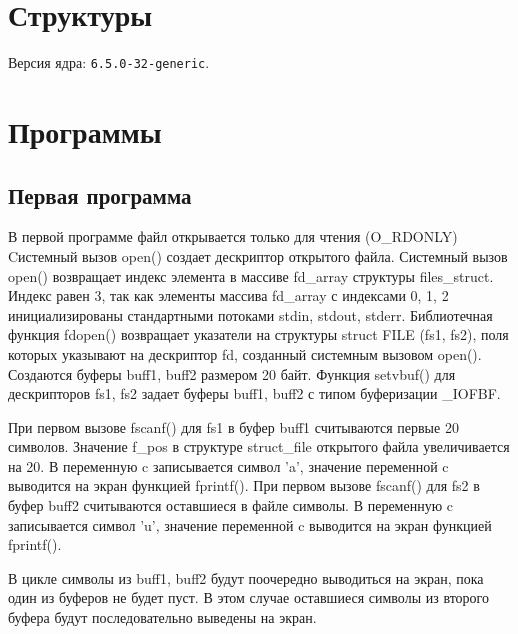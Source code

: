 \chapter{Структуры}

Версия ядра: \texttt{6.5.0-32-generic}.



\chapter{Программы}

\section{Первая программа}



В первой программе файл открывается только для чтения (O\_RDONLY)
Cистемный вызов open() создает дескриптор открытого файла.
Системный вызов open() возвращает индекс элемента в массиве fd\_array структуры files\_struct.
Индекс равен 3, так как элементы массива fd\_array с индексами 0, 1, 2 инициализированы стандартными потоками stdin, stdout, stderr.
Библиотечная функция fdopen() возвращает указатели на структуры struct FILE (fs1, fs2), поля которых указывают на дескриптор fd, созданный системным вызовом open().
Создаются буферы buff1, buff2 размером 20 байт.
Функция setvbuf() для дескрипторов fs1, fs2 задает буферы buff1, buff2 с типом буферизации \_IOFBF.

При первом вызове fscanf() для fs1 в буфер buff1 считываются первые 20 символов.
Значение f\_pos в структуре struct\_file открытого файла увеличивается на 20.
В переменную c записывается символ 'a', значение переменной c выводится на экран функцией fprintf().
При первом вызове fscanf() для fs2 в буфер buff2 считываются оставшиеся в файле символы.
В переменную c записывается символ 'u', значение переменной c выводится на экран функцией fprintf().
 
В цикле символы из buff1, buff2 будут поочередно выводиться на экран, пока один из буферов не будет пуст.
В этом случае оставшиеся символы из второго буфера будут последовательно выведены на экран.

